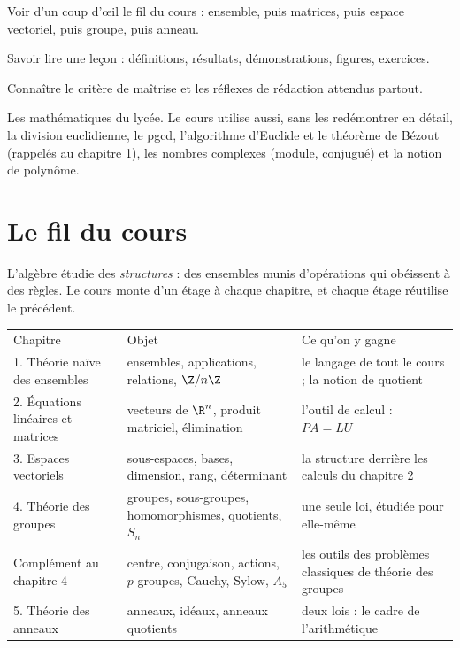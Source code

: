 \begin{objectifs}
\item Voir d'un coup d'œil le fil du cours : ensemble, puis matrices, puis espace vectoriel, puis groupe, puis anneau.
\item Savoir lire une leçon : définitions, résultats, démonstrations, figures, exercices.
\item Connaître le critère de maîtrise et les réflexes de rédaction attendus partout.
\end{objectifs}
\begin{prerequis}
Les mathématiques du lycée. Le cours utilise aussi, sans les redémontrer en détail, la division euclidienne, le pgcd, l'algorithme d'Euclide et le théorème de Bézout (rappelés au chapitre 1), les nombres complexes (module, conjugué) et la notion de polynôme.
\end{prerequis}

\section{Le fil du cours}
L'algèbre étudie des \emph{structures} : des ensembles munis d'opérations qui obéissent à des règles. Le cours monte d'un étage à chaque chapitre, et chaque étage réutilise le précédent.

\begin{tabular}{lll}
Chapitre & Objet & Ce qu'on y gagne \\
1. Théorie naïve des ensembles & ensembles, applications, relations, $\Z/n\Z$ & le langage de tout le cours ; la notion de quotient \\
2. Équations linéaires et matrices & vecteurs de $\R^n$, produit matriciel, élimination & l'outil de calcul : $PA=LU$ \\
3. Espaces vectoriels & sous-espaces, bases, dimension, rang, déterminant & la structure derrière les calculs du chapitre 2 \\
4. Théorie des groupes & groupes, sous-groupes, homomorphismes, quotients, $S_n$ & une seule loi, étudiée pour elle-même \\
Complément au chapitre 4 & centre, conjugaison, actions, $p$-groupes, Cauchy, Sylow, $A_5$ & les outils des problèmes classiques de théorie des groupes \\
5. Théorie des anneaux & anneaux, idéaux, anneaux quotients & deux lois : le cadre de l'arithmétique \\
\end{tabular}

